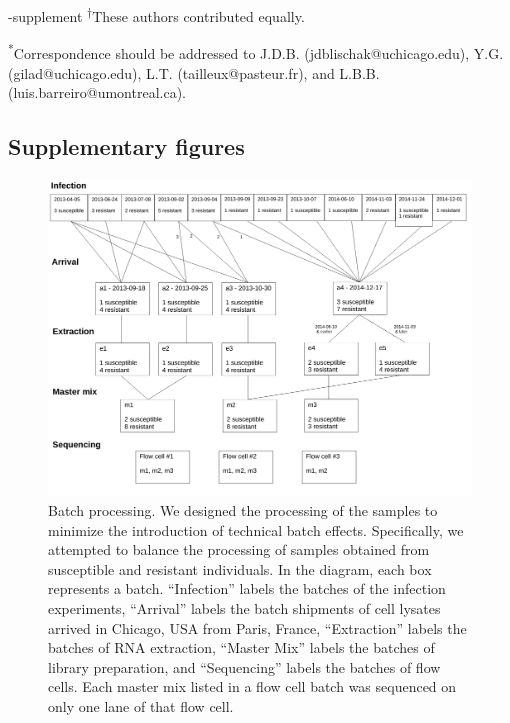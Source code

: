 \documentclass[fleqn,10pt]{wlscirep}
\begin{document}
\begin{filecontents}{\jobname-supplement}
\textsuperscript{$\dag$}These authors contributed equally.

\textsuperscript{*}Correspondence should be addressed to J.D.B.
(jdblischak@uchicago.edu), Y.G. (gilad@uchicago.edu), L.T.
(tailleux@pasteur.fr), and L.B.B. (luis.barreiro@umontreal.ca).
\newpage
\subsection*{Supplementary figures}


\begin{figure}[ht]
\centering
\includegraphics[width=\linewidth]{../figure/processing.pdf}
\caption{
Batch processing. We designed the processing of the samples to
minimize the introduction of technical batch effects. Specifically, we
attempted to balance the processing of samples obtained from
susceptible and resistant individuals. In the diagram, each box
represents a batch. “Infection” labels the batches of the infection
experiments, “Arrival” labels the batch shipments of cell lysates
arrived in Chicago, USA from Paris, France, “Extraction” labels the
batches of RNA extraction, “Master Mix” labels the batches of library
preparation, and “Sequencing” labels the batches of flow cells. Each
master mix listed in a flow cell batch was sequenced on only one lane
of that flow cell.
}
\label{fig:process}
\end{figure}



\end{filecontents}
\end{document}

